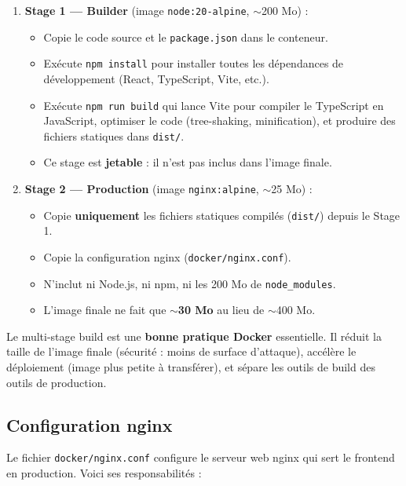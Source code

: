 \documentclass[12pt,a4paper,twoside]{report}
\begin{document}
\begin{enumerate}
    \item \textbf{Stage 1 --- Builder} (image \texttt{node:20-alpine}, $\sim$200 Mo) :
    \begin{itemize}
        \item Copie le code source et le \texttt{package.json} dans le conteneur.
        \item Exécute \texttt{npm install} pour installer toutes les dépendances de développement (React, TypeScript, Vite, etc.).
        \item Exécute \texttt{npm run build} qui lance Vite pour compiler le TypeScript en JavaScript, optimiser le code (tree-shaking, minification), et produire des fichiers statiques dans \texttt{dist/}.
        \item Ce stage est \textbf{jetable} : il n'est pas inclus dans l'image finale.
    \end{itemize}
    
    \item \textbf{Stage 2 --- Production} (image \texttt{nginx:alpine}, $\sim$25 Mo) :
    \begin{itemize}
        \item Copie \textbf{uniquement} les fichiers statiques compilés (\texttt{dist/}) depuis le Stage 1.
        \item Copie la configuration nginx (\texttt{docker/nginx.conf}).
        \item N'inclut ni Node.js, ni npm, ni les 200 Mo de \texttt{node\_modules}.
        \item L'image finale ne fait que $\sim$\textbf{30 Mo} au lieu de $\sim$400 Mo.
    \end{itemize}
\end{enumerate}

\begin{tipbox}
Le multi-stage build est une \textbf{bonne pratique Docker} essentielle. Il réduit la taille de l'image finale (sécurité : moins de surface d'attaque), accélère le déploiement (image plus petite à transférer), et sépare les outils de build des outils de production.
\end{tipbox}

\subsection{Configuration nginx}

Le fichier \texttt{docker/nginx.conf} configure le serveur web nginx qui sert le frontend en production. Voici ses responsabilités :
\end{document}
